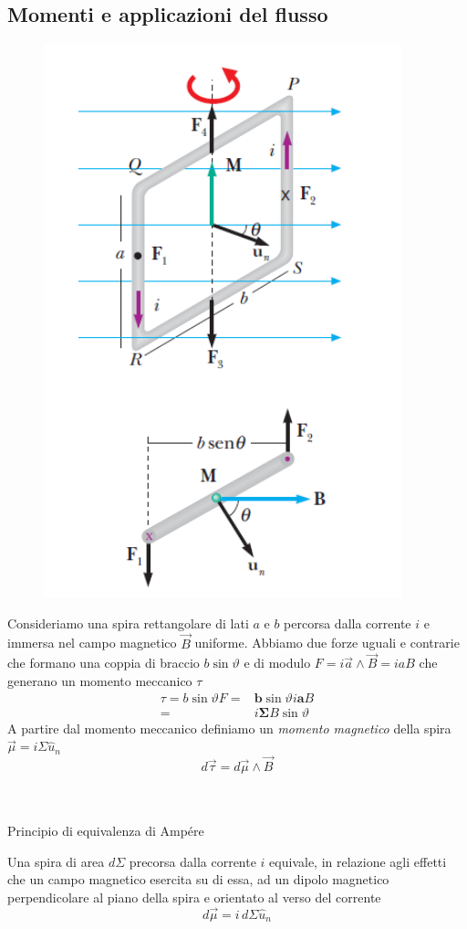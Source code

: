 \documentclass[x11names]{report}
\newcommand{\teorema}[2]{
	\begin{center}
		\fboxsep11pt
		\colorbox{myred}{\begin{minipage}{5.75in}
				\begin{redes}{#1}
					#2
				\end{redes}
		\end{minipage}}
	\end{center}
}
\begin{document}
\subsection{Momenti e applicazioni del flusso}
\begin{figure}
	\vspace{-0.4cm}
	\includegraphics[scale=0.4]{img/spira_1.png}
\end{figure}
Consideriamo una spira rettangolare di lati \(a\) e \(b\) percorsa dalla corrente \(i\) e immersa nel campo magnetico \(\vec{B}\) uniforme. Abbiamo due forze uguali e contrarie che formano una coppia di braccio \(b\sin\vartheta\) e di modulo \(F = i \vec{a}\wedge\vec{B} = i a B\) che generano un momento meccanico \(\tau\)
\begin{align*}
	\tau = b\sin\vartheta F =& \boldsymbol{b}\sin\vartheta i \boldsymbol{a} B \\
	                     =& i\boldsymbol{\Sigma}B\sin\vartheta
\end{align*}
A partire dal momento meccanico definiamo un \textit{momento magnetico} della spira \(\vec{\mu} = i\Sigma\hat{u}_n\) 
\[
d\vec{\tau} = d\vec{\mu}\wedge\vec{B}
\]\\ \\
\teorema{Principio di equivalenza di Ampére}{
Una spira di area \(d\Sigma\) precorsa dalla corrente \(i\) equivale, in relazione agli effetti che un campo magnetico esercita su di essa, ad un dipolo magnetico perpendicolare al piano della spira e orientato al verso del corrente
\begin{equation}
	d\vec{\mu} = i \, d\Sigma \hat{u}_n
\end{equation}}
\end{document}

